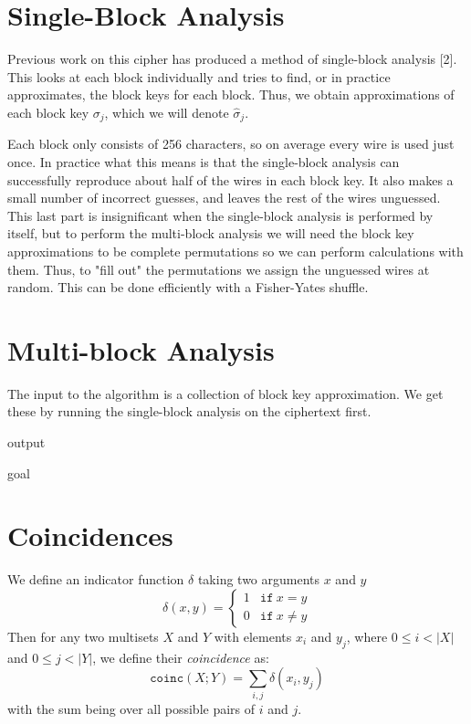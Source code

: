 \documentclass[12pt]{article}
\newcommand{\coinc}[2]{\texttt{coinc}(#1;#2)}
\theoremstyle{definition}
\theoremstyle{remark}
\theoremstyle{remark}
\begin{document}
\section{Single-Block Analysis}
\par
Previous work on this cipher has produced a method of single-block analysis [2]. This looks at each block individually and tries to find, or in practice approximates, the block keys for each block. Thus, we obtain approximations of each block key $\sigma_j$, which we will denote $\hat{\sigma}_j$. 

\par
Each block only consists of 256 characters, so on average every wire is used just once.
In practice what this means is that the single-block analysis can successfully reproduce about half of the wires in each block key. It also makes a small number of incorrect guesses, and leaves the rest of the wires unguessed. This last part is insignificant when the single-block analysis is performed by itself, but to perform the multi-block analysis we will need the block key approximations to be complete permutations so we can perform calculations with them. Thus, to "fill out" the permutations we assign the unguessed wires at random. This can be done efficiently with a Fisher-Yates shuffle.

\par

\section{Multi-block Analysis}
\par

\par
The input to the algorithm is a collection of block key approximation. We get these by running the single-block analysis on the ciphertext first. 

\par
output

\par
goal
\section{Coincidences}
\par

\par
We define an indicator function $\delta$ taking two arguments $x$ and $y$
\[
	\delta(x,y)=
	\begin{cases}
		1 & \texttt{if}\ x=y \\
		0 & \texttt{if}\ x \neq y
	\end{cases}
\]
Then for any two multisets $X$ and $Y$ with elements $x_i$ and $y_j$, where $0\leq i < |X|$ and $0\leq j < |Y|$, we define their \emph{coincidence} as:
\begin{equation}
	\coinc{X}{Y} = \sum_{i,j} \delta(x_i,y_j)
\end{equation}
with the sum being over all possible pairs of $i$ and $j$.
\end{document}
